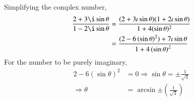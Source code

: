 Simplifying the complex number,
%
\begin{align}
\frac{2+3 \i\sin\theta}{1-2\i\sin\theta} 
&= 
\frac{(2+3\iota\sin\theta)(1+2\iota\sin\theta)}{1+4(\sin\theta)^2}
\\
&=\frac{(2-6\left(\sin\theta\right)^2)+7\iota\sin\theta}{1+4\left(\sin\theta\right)^2}
\end{align}
For the number to be purely imaginary, 
\begin{align}
2-6\left(\sin\theta\right)^2&=0
\Rightarrow
\sin\theta=\pm\frac{1}{\sqrt{3}} 
\\
\Rightarrow 
\theta&=\arcsin{\pm\left(\frac{1}{\sqrt{3}}\right)}   
\end{align}
